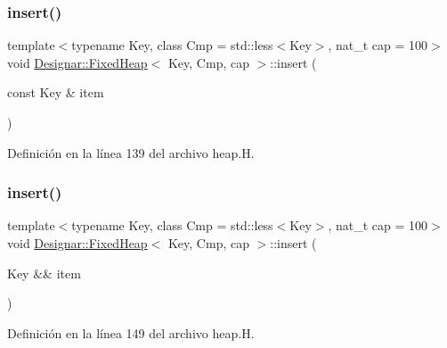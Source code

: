 \subsubsection{\texorpdfstring{insert()}{insert()}\hspace{0.1cm}{\footnotesize\ttfamily [1/2]}}
{\footnotesize\ttfamily template$<$typename Key, class Cmp = std\+::less$<$\+Key$>$, nat\+\_\+t cap = 100$>$ \\
void \hyperlink{class_designar_1_1_fixed_heap}{Designar\+::\+Fixed\+Heap}$<$ Key, Cmp, cap $>$\+::insert (\begin{DoxyParamCaption}\item[{const Key \&}]{item }\end{DoxyParamCaption})\hspace{0.3cm}{\ttfamily [inline]}}



Definición en la línea 139 del archivo heap.\+H.

\mbox{\label{class_designar_1_1_fixed_heap_a7169684fe8e25834174cd2b1edcaf567}} 
\subsubsection{\texorpdfstring{insert()}{insert()}\hspace{0.1cm}{\footnotesize\ttfamily [2/2]}}
{\footnotesize\ttfamily template$<$typename Key, class Cmp = std\+::less$<$\+Key$>$, nat\+\_\+t cap = 100$>$ \\
void \hyperlink{class_designar_1_1_fixed_heap}{Designar\+::\+Fixed\+Heap}$<$ Key, Cmp, cap $>$\+::insert (\begin{DoxyParamCaption}\item[{Key \&\&}]{item }\end{DoxyParamCaption})\hspace{0.3cm}{\ttfamily [inline]}}



Definición en la línea 149 del archivo heap.\+H.

\mbox{\label{class_designar_1_1_fixed_heap_a58cfde8fd6eedd215b79219970bf8fb8}} 
